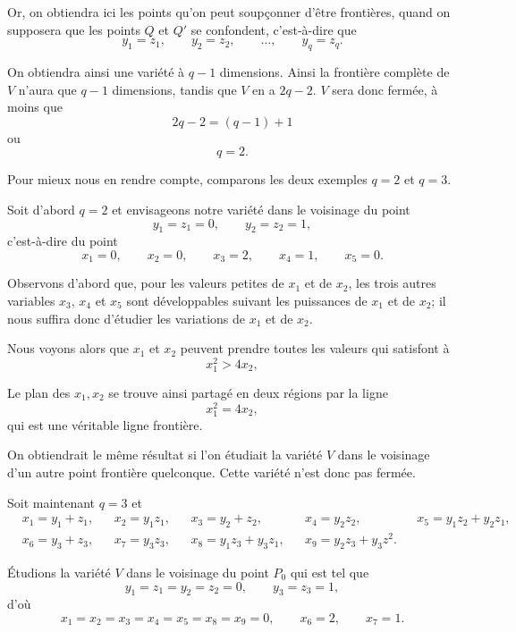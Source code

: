 \documentclass{article}
\begin{document}
Or, on obtiendra ici les points qu'on peut soupçonner d'être frontières, quand on supposera que les points $Q$ et $Q'$ se confondent, c'est-à-dire que
\[ y_{1} = z_{1}, \qquad y_{2} = z_{2}, \qquad \ldots, \qquad y_{q} = z_{q}. \]

On obtiendra ainsi une variété à $q - 1$ dimensions. Ainsi la frontière complète de $V$ n'aura que $q - 1$ dimensions, tandis que $V$ en a $2q - 2$. $V$ sera donc fermée, à moins que
\[ 2q - 2 = (q - 1) + 1 \]
ou
\[ q = 2. \]

Pour mieux nous en rendre compte, comparons les deux exemples $q = 2$ et $q = 3$.

Soit d'abord $q = 2$ et envisageons notre variété dans le voisinage du point
\[ y_{1} = z_{1} = 0, \qquad y_{2} = z_{2} = 1, \]
c'est-à-dire du point
\[ x_{1} = 0, \qquad x_{2} = 0, \qquad x_{3} = 2, \qquad x_{4} = 1, \qquad x_{5} = 0. \]

Observons d'abord que, pour les valeurs petites de $x_{1}$ et de $x_{2}$, les trois autres variables $x_{3}$, $x_{4}$ et $x_{5}$ sont développables suivant les puissances de $x_{1}$ et de $x_{2}$; il nous suffira donc d'étudier les variations de $x_{1}$ et de $x_{2}$.

Nous voyons alors que $x_{1}$ et $x_{2}$ peuvent prendre toutes les valeurs qui satisfont à
\[ x^{2}_{1} > 4x_{2}, \]

Le plan des $x_{1}, x_{2}$ se trouve ainsi partagé en deux régions par la ligne
\[ x^{2}_{1} = 4x_{2}, \]
qui est une véritable ligne frontière.

On obtiendrait le même résultat si l'on étudiait la variété $V$ dans le voisinage d'un autre point frontière quelconque. Cette variété n'est donc pas fermée.

Soit maintenant $q = 3$ et
\[ \begin{aligned} &x_{1} = y_{1} + z_{1}, &&x_{2} = y_{1}z_{1}, &&x_{3} = y_{2} + z_{2}, &&x_{4} = y_{2}z_{2}, &&x_{5} = y_{1}z_{2} + y_{2}z_{1},\\ &x_{6} = y_{3} + z_{3}, &&x_{7} = y_{3}z_{3}, &&x_{8} = y_{1}z_{3} + y_{3}z_{1}, &&x_{9} = y_{2}z_{3} + y_{3}z^{2}. \end{aligned} \]

Étudions la variété $V$ dans le voisinage du point $P_{0}$ qui est tel que
\[ y_{1} = z_{1} = y_{2} = z_{2} = 0, \qquad y_{3} = z_{3} = 1, \]
d'où
\[ x_{1} = x_{2} = x_{3} = x_{4} = x_{5} = x_{8} = x_{9} = 0, \qquad x_{6} = 2, \qquad x_{7} = 1. \]
\end{document}

